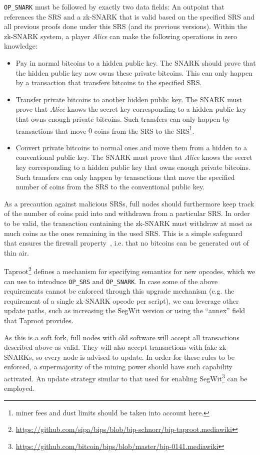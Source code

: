   \texttt{OP\_SNARK} must be followed by exactly two data fields: An outpoint
  that references the SRS and a zk-SNARK that is valid based on the specified
  SRS and all previous proofs done under this SRS (and its previous versions).
  Within the zk-SNARK system, a player \emph{Alice} can make the following
  operations in zero knowledge:
  \begin{itemize}
    \item Pay in normal bitcoins to a hidden public key. The SNARK should prove
    that the hidden public key now owns these private bitcoins. This can only
    happen by a transaction that transfers bitcoins to the specified SRS.
    \item Transfer private bitcoins to another hidden public key. The SNARK must
    prove that \emph{Alice} knows the secret key corresponding to a hidden
    public key that owns enough private bitcoins. Such transfers can only happen
    by transactions that move $0$ coins from the SRS to the SRS\footnote{miner
    fees and dust limits should be taken into account here.}.
    \item Convert private bitcoins to normal ones and move them from a hidden to
    a conventional public key. The SNARK must prove that \emph{Alice} knows the
    secret key corresponding to a hidden public key that owns enough private
    bitcoins. Such transfers can only happen by transactions that move the
    specified number of coins from the SRS to the conventional public key.
  \end{itemize}

  As a precaution against malicious SRSs, full nodes should furthermore keep
  track of the number of coins paid into and withdrawn from a particular SRS. In
  order to be valid, the transaction containing the zk-SNARK must withdraw at
  most as much coins as the ones remaining in the used SRS. This is a simple
  safeguard that ensures the firewall property~\cite{DBLP:conf/sp/GaziKZ19},
  i.e. that no bitcoins can be generated out of thin air.

  Taproot\footnote{\url{https://github.com/sipa/bips/blob/bip-schnorr/bip-taproot.mediawiki}}
  defines a mechanism for specifying semantics for new opcodes, which we can use
  to introduce \texttt{OP\_SRS} and \texttt{OP\_SNARK}. In case some of the
  above requirements cannot be enforced through this upgrade mechanism (e.g. the
  requirement of a single zk-SNARK opcode per script), we can leverage other
  update paths, such as increasing the SegWit version or using the ``annex''
  field that Taproot provides.

  As this is a soft fork, full nodes with old software will accept all
  transactions described above as valid. They will also accept transactions with
  fake zk-SNARKs, so every node is advised to update. In order for these rules
  to be enforced, a supermajority of the mining power should have such
  capability activated. An update strategy similar to that used for enabling
  SegWit\footnote{\url{https://github.com/bitcoin/bips/blob/master/bip-0141.mediawiki}}
  can be employed.
